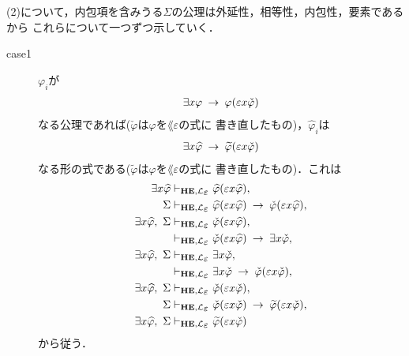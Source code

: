 \begin{metaprf}
		(2)について，内包項を含みうる$\Sigma$の公理は外延性，相等性，内包性，要素であるから
		これらについて一つずつ示していく．
		\begin{description}
			\item[case1] $\varphi_{i}$が
				\begin{align}
					\exists x \varphi \hspace{0.25em}\rightarrow\hspace{0.25em} \varphi(\varepsilon x \check{\varphi})
				\end{align}
				なる公理であれば($\check{\varphi}$は$\varphi$を$\lang{\varepsilon}$の式に
				書き直したもの)，$\widehat{\varphi}_{i}$は
				\begin{align}
					\exists x \widehat{\varphi} \hspace{0.25em}\rightarrow\hspace{0.25em} \widetilde{\varphi}(\varepsilon x \check{\varphi})
				\end{align}
				なる形の式である($\widetilde{\varphi}$は$\varphi$を$\lang{\varepsilon}$の式に
				書き直したもの)．これは
				\begin{align}
					\exists x \widehat{\varphi} &\provable{\mbox{{\bf HE}},\lang{\varepsilon}} \widehat{\varphi}(\varepsilon x \widehat{\varphi}), \\
					\Sigma &\provable{\mbox{{\bf HE}},\lang{\varepsilon}} \widehat{\varphi}(\varepsilon x \widehat{\varphi}) \rarrow \check{\varphi}(\varepsilon x \widehat{\varphi}), \\
					\exists x \widehat{\varphi},\ \Sigma &\provable{\mbox{{\bf HE}},\lang{\varepsilon}} \check{\varphi}(\varepsilon x \widehat{\varphi}), \\
					&\provable{\mbox{{\bf HE}},\lang{\varepsilon}} \check{\varphi}(\varepsilon x \widehat{\varphi}) \rarrow \exists x \check{\varphi}, \\
					\exists x \widehat{\varphi},\ \Sigma &\provable{\mbox{{\bf HE}},\lang{\varepsilon}} \exists x \check{\varphi}, \\
					&\provable{\mbox{{\bf HE}},\lang{\varepsilon}} \exists x \check{\varphi} \rarrow \check{\varphi}(\varepsilon x \check{\varphi}), \\
					\exists x \widehat{\varphi},\ \Sigma &\provable{\mbox{{\bf HE}},\lang{\varepsilon}} \check{\varphi}(\varepsilon x \check{\varphi}), \\
					\Sigma &\provable{\mbox{{\bf HE}},\lang{\varepsilon}} \check{\varphi}(\varepsilon x \check{\varphi}) \rarrow  \widetilde{\varphi}(\varepsilon x \check{\varphi}), \\
					\exists x \widehat{\varphi},\ \Sigma &\provable{\mbox{{\bf HE}},\lang{\varepsilon}} \widetilde{\varphi}(\varepsilon x \check{\varphi})
				\end{align}
				から従う．
				

\end{description}
\end{metaprf}
